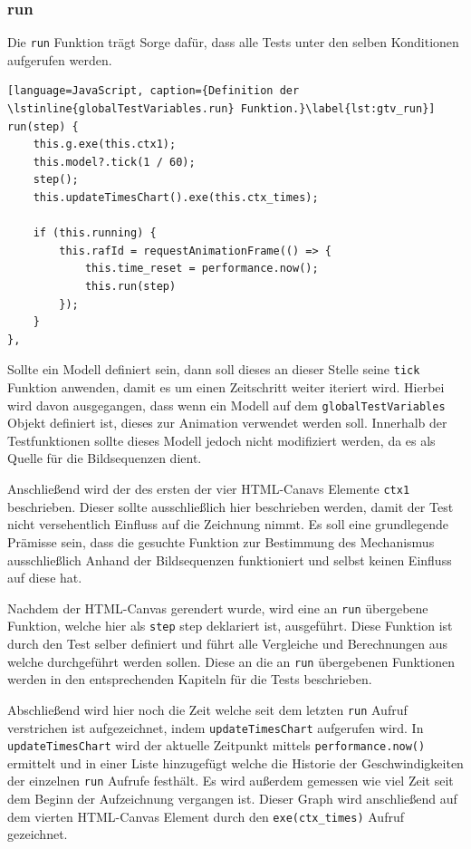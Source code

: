 
\subsubsection{run}\label{ch:gtv_run}

Die \lstinline{run} Funktion trägt Sorge dafür, dass alle Tests unter den selben Konditionen aufgerufen werden.

\begin{lstlisting}[language=JavaScript, caption={Definition der \lstinline{globalTestVariables.run} Funktion.}\label{lst:gtv_run}]
run(step) {
    this.g.exe(this.ctx1);
    this.model?.tick(1 / 60);
    step();
    this.updateTimesChart().exe(this.ctx_times);

    if (this.running) {
        this.rafId = requestAnimationFrame(() => {
            this.time_reset = performance.now();
            this.run(step)
        });
    }
},
\end{lstlisting}

Sollte ein  Modell definiert sein, dann soll dieses an dieser Stelle seine \lstinline{tick} Funktion anwenden, damit es um einen Zeitschritt weiter iteriert wird.
Hierbei wird davon ausgegangen, dass wenn ein  Modell auf dem \lstinline{globalTestVariables} Objekt definiert ist, dieses zur Animation verwendet werden soll.
Innerhalb der Testfunktionen sollte dieses Modell jedoch nicht modifiziert werden, da es als Quelle für die Bildsequenzen dient.

Anschließend wird der  des ersten der vier HTML-Canavs Elemente \lstinline{ctx1} beschrieben.
Dieser sollte ausschließlich hier beschrieben werden, damit der Test nicht versehentlich Einfluss auf die Zeichnung nimmt.
Es soll eine grundlegende Prämisse sein, dass die gesuchte Funktion zur Bestimmung des Mechanismus ausschließlich Anhand der Bildsequenzen funktioniert und selbst keinen Einfluss auf diese hat.

Nachdem der HTML-Canvas gerendert wurde, wird eine an \lstinline{run} übergebene Funktion, welche hier als \lstinline{step} step deklariert ist, ausgeführt.
Diese Funktion ist durch den Test selber definiert und führt alle Vergleiche und Berechnungen aus welche durchgeführt werden sollen.
Diese an die an \lstinline{run} übergebenen Funktionen werden in den entsprechenden Kapiteln für die Tests beschrieben.

Abschließend wird hier noch die Zeit welche seit dem letzten \lstinline{run} Aufruf verstrichen ist aufgezeichnet, indem \lstinline{updateTimesChart} aufgerufen wird.
In \lstinline{updateTimesChart} wird der aktuelle Zeitpunkt mittels \lstinline{performance.now()} %
ermittelt und in einer Liste hinzugefügt welche die Historie der Geschwindigkeiten der einzelnen \lstinline{run} Aufrufe festhält.
Es wird außerdem gemessen wie viel Zeit seit dem Beginn der Aufzeichnung vergangen ist.
Dieser Graph wird anschließend auf dem vierten HTML-Canvas Element durch den \lstinline{exe(ctx_times)} Aufruf gezeichnet.

